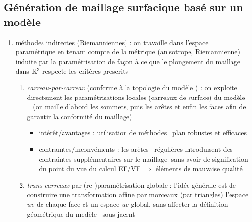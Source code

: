 \subsection{Génération de maillage surfacique basé sur un modèle \brep}
\begin{enumerate}
	\item méthodes indirectes (Riemanniennes) : on travaille dans l'espace paramétrique en tenant compte de la métrique (anisotrope, Riemannienne) induite par la paramétrisation de façon à ce que le plongement du maillage dans $\mathbb{R}^3$ respecte les critères prescrits
	\begin{enumerate}
		\item \textit{carreau-par-carreau} (\ie conforme à la topologie du modèle \brep) : on exploite directement les paramétrisations locales (carreaux de surface) du modèle \brep\ \cite{borouchaki2000} (on maille d'abord les sommets, puis les arêtes et enfin les faces afin de garantir la conformité du maillage)
		\begin{itemize}
			\item intérêt/avantages : utilisation de méthodes \deuxD\ plan robustes et efficaces
			\item contraintes/inconvénients : les arêtes \brep\ régulières introduisent des contraintes supplémentaires sur le maillage, sans avoir de signification du point du vue du calcul EF/VF $\Rightarrow$ éléments de mauvaise qualité
		\end{itemize}
		\item \textit{trans-carreaux} par (re-)paramétrisation globale : l'idée générale est de construire une transformation affine par morceaux (par triangles) l'espace $uv$ de chaque face et un espace $uv$ global, sans affecter la définition géométrique du modèle \brep\ sous-jacent
			\begin{enumerate}
			

\end{enumerate}
\end{enumerate}
\end{enumerate}
